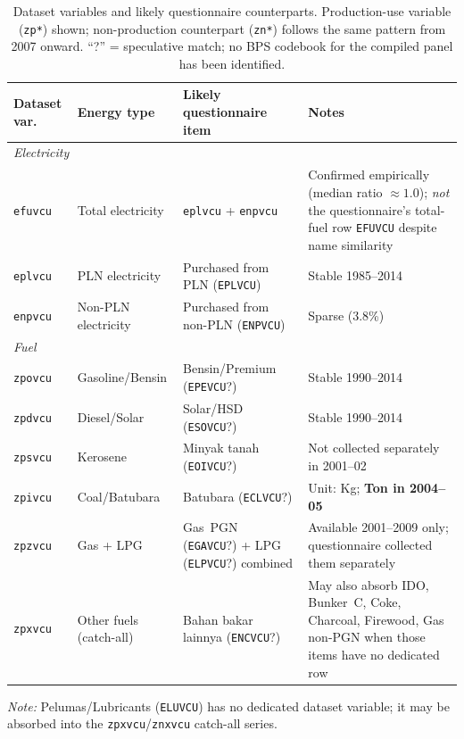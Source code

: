 \documentclass[11pt, a4paper]{article}
\begin{document}
\begin{table}[H]
\centering
\caption{Dataset variables and likely questionnaire counterparts.
  Production-use variable (\texttt{zp*}) shown; non-production counterpart (\texttt{zn*})
  follows the same pattern from 2007 onward. ``?'' = speculative match; no BPS codebook
  for the compiled panel has been identified.}
\label{tab:varmap}
\small\setlength{\tabcolsep}{4pt}
\begin{tabular}{p{1.8cm}p{2.2cm}p{3.2cm}p{5.5cm}}
\toprule
\textbf{Dataset var.} & \textbf{Energy type} & \textbf{Likely questionnaire item} & \textbf{Notes} \\
\midrule
\multicolumn{4}{l}{\textit{Electricity}} \\
\texttt{efuvcu}  & Total electricity & \texttt{eplvcu} + \texttt{enpvcu} &
  Confirmed empirically (median ratio $\approx 1.0$); \textit{not} the questionnaire's
  total-fuel row \texttt{EFUVCU} despite name similarity \\
\texttt{eplvcu}  & PLN electricity   & Purchased from PLN (\texttt{EPLVCU})  & Stable 1985--2014 \\
\texttt{enpvcu}  & Non-PLN electricity & Purchased from non-PLN (\texttt{ENPVCU}) & Sparse (3.8\%) \\
\midrule
\multicolumn{4}{l}{\textit{Fuel}} \\
\texttt{zpovcu}  & Gasoline/Bensin   & Bensin/Premium (\texttt{EPEVCU}?)  & Stable 1990--2014 \\
\texttt{zpdvcu}  & Diesel/Solar      & Solar/HSD (\texttt{ESOVCU}?)       & Stable 1990--2014 \\
\texttt{zpsvcu}  & Kerosene          & Minyak tanah (\texttt{EOIVCU}?)    & Not collected separately in 2001--02 \\
\texttt{zpivcu}  & Coal/Batubara     & Batubara (\texttt{ECLVCU}?)        & Unit: Kg; \textbf{Ton in 2004--05} \\
\texttt{zpzvcu}  & Gas + LPG         & Gas~PGN (\texttt{EGAVCU}?) + LPG (\texttt{ELPVCU}?) combined &
  Available 2001--2009 only; questionnaire collected them separately \\
\texttt{zpxvcu}  & Other fuels (catch-all) & Bahan bakar lainnya (\texttt{ENCVCU}?) &
  May also absorb IDO, Bunker~C, Coke, Charcoal, Firewood, Gas non-PGN when those items
  have no dedicated row \\
\bottomrule
\end{tabular}
\vspace{0.3em}

\noindent\small\textit{Note:} Pelumas/Lubricants (\texttt{ELUVCU}) has no dedicated dataset
variable; it may be absorbed into the \texttt{zpxvcu}/\texttt{znxvcu} catch-all series.
\end{table}
\end{document}
